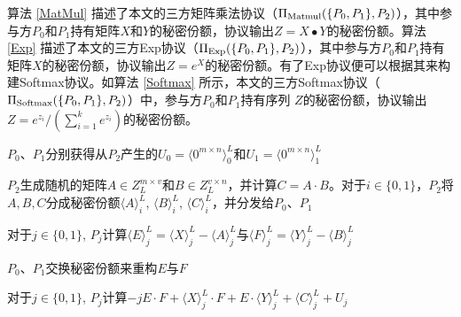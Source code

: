 算法 \ref{MatMul} 描述了本文的三方矩阵乘法协议（$\Pi_{\rm Matmul}(\{P_0, P_1\}, P_2)$），其中参与方$P_0$和$P_1$持有矩阵$X$和$Y$的秘密份额，协议输出$Z=X∙Y$的秘密份额。算法 \ref{Exp} 描述了本文的三方Exp协议（$\Pi_{\rm Exp}(\{P_0, P_1\}, P_2)$），其中参与方$P_0$和$P_1$持有矩阵$X$的秘密份额，协议输出$Z=e^X$的秘密份额。有了Exp协议便可以根据其来构建Softmax协议。如算法 \ref{Softmax} 所示，本文的三方Softmax协议（$\Pi_{\rm Softmax}(\{P_0, P_1\}, P_2)$）中，参与方$P_0$和$P_1$持有序列 $Z$的秘密份额，协议输出$Z=e^{z_i}/(\sum_{i=1}^k e^{z_i})$的秘密份额。

%	
%	
%	
%	
%	
%	
%	

\begin{algorithm}[H]
	\SetAlgoLined
	
	$P_0$、$P_1$分别获得从$P_2$产生的$U_0=\langle 0^{m\times n}\rangle_0^L$和$U_1=\langle 0^{m\times n}\rangle_1^L$
	
	$P_2$生成随机的矩阵$A\in Z_L^{m\times v}$和$B\in Z_L^{v\times n}$，并计算$C=A\cdot B$。对于$i\in \{0, 1\}$，$P_2$将$A, B, C$分成秘密份额$\langle A\rangle_i^L$, $\langle B\rangle_i^L$, $\langle C\rangle_i^L$，并分发给$P_0$、$P_1$
	
	对于$j\in \{0, 1\}$, $P_j$计算$\langle E\rangle_j^L = \langle X\rangle_j^L - \langle A\rangle_j^L$与$\langle F\rangle_j^L = \langle Y\rangle_j^L - \langle B\rangle_j^L$ 
	
	$P_0$、$P_1$交换秘密份额来重构$E$与$F$
	
	对于$j\in \{0, 1\}$, $P_j$计算$-jE\cdot F + \langle X\rangle_j^L\cdot F + E\cdot \langle Y\rangle_j^L + \langle C\rangle_j^L + U_j$
	
	\caption{ $\Pi_{\rm Matmul}(\{P_0, P_1\}, P_2)$ }
	\label{MatMul}
\end{algorithm}

